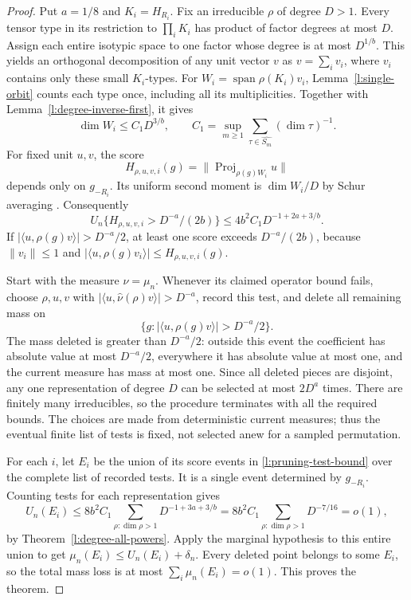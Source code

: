 \begin{proof}
Put $a=1/8$ and $K_i=H_{R_i}$. Fix an irreducible $\rho$ of degree
$D>1$. Every tensor type in its restriction to $\prod_iK_i$ has
product of factor degrees at most $D$. Assign each entire isotypic
space to one factor whose degree is at most $D^{1/b}$. This yields
an orthogonal decomposition of any unit vector $v$ as
$v=\sum_i v_i$, where $v_i$ contains only these small $K_i$-types.
For $W_i=\operatorname{span}\rho(K_i)v_i$,
Lemma~\ref{l:single-orbit} counts each type once, including all its
multiplicities. Together with Lemma~\ref{l:degree-inverse-first}, it gives
\[
 \dim W_i\le C_1D^{3/b},\qquad
 C_1=\sup_{m\ge1}\sum_{\tau\in\widehat{S_m}}(\dim\tau)^{-1}.
\]
For fixed unit $u,v$, the score
\[
 H_{\rho,u,v,i}(g)=\|\operatorname{Proj}_{\rho(g)W_i}u\|
\]
depends only on $g_{-R_i}$. Its uniform second moment is
$\dim W_i/D$ by Schur averaging
\cite[Proposition~3.14]{etingof}. Consequently
\begin{equation}
 U_n\{H_{\rho,u,v,i}>D^{-a}/(2b)\}
 \le4b^2C_1D^{-1+2a+3/b}.
 \label{l:pruning-test-bound}
\end{equation}
If $|\langle u,\rho(g)v\rangle|>D^{-a}/2$, at least one score
exceeds $D^{-a}/(2b)$, because $\|v_i\|\le1$ and
$|\langle u,\rho(g)v_i\rangle|\le H_{\rho,u,v,i}(g)$.

Start with the measure $\nu=\mu_n$. Whenever its claimed operator
bound fails, choose $\rho,u,v$ with
$|\langle u,\widehat\nu(\rho)v\rangle|>D^{-a}$, record this
test, and delete all remaining mass on
\[
 \{g:|\langle u,\rho(g)v\rangle|>D^{-a}/2\}.
\]
The mass deleted is greater than $D^{-a}/2$: outside this event the
coefficient has absolute value at most $D^{-a}/2$, everywhere it has
absolute value at most one, and the current measure has mass at most
one. Since all deleted pieces are disjoint, any one representation of
degree $D$ can be selected at most $2D^a$ times. There are finitely many
irreducibles, so the procedure terminates with all the required bounds.
The choices are made from deterministic current measures; thus the
eventual finite list of tests is fixed, not selected anew for a sampled
permutation.

For each $i$, let $E_i$ be the union of its score events in
\eqref{l:pruning-test-bound} over the complete list of recorded tests.
It is a single event determined by $g_{-R_i}$. Counting tests for each
representation gives
\[
 U_n(E_i)\le8b^2C_1\sum_{\rho:\dim\rho>1}
             D^{-1+3a+3/b}
 =8b^2C_1\sum_{\rho:\dim\rho>1}D^{-7/16}=o(1),
\]
by Theorem~\ref{l:degree-all-powers}. Apply the marginal hypothesis to
this entire union to get $\mu_n(E_i)\le U_n(E_i)+\delta_n$.
Every deleted point belongs to some $E_i$, so the total mass loss is
at most $\sum_i\mu_n(E_i)=o(1)$. This proves the theorem.
\end{proof}

